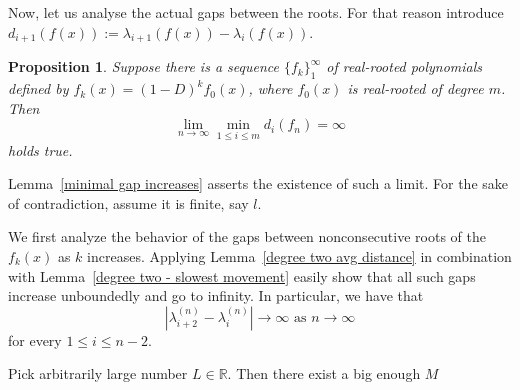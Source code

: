 \documentclass[11pt]{article}
\newtheorem{proposition}[theorem]{Proposition}
\begin{document}
Now, let us analyse the actual gaps between the roots. For that reason introduce $d_{i+1}(f(x)) := \lambda_{i+1}(f(x)) - \lambda_i(f(x))$.

\begin{proposition}
\label{miniamal gap is unbounded} 
Suppose there is a sequence $\{f_k\}_1^\infty$ of real-rooted polynomials defined by $f_k(x) = (1-D)^k f_0(x)$, where $f_0(x)$ is real-rooted of degree $m$. Then
\[\lim_{n\to\infty} \min_{1\leq i \leq m} d_i (f_n) = \infty\]
holds true.
\end{proposition}
\proof Lemma~\ref{minimal gap increases} asserts the existence of such a limit. For the sake of contradiction, assume it is finite, say $l$. 

We first analyze the behavior of the gaps between nonconsecutive roots of the $f_k(x)$ as $k$ increases. Applying Lemma~\ref{degree two avg distance} in combination with Lemma~\ref{degree two - slowest movement} easily show that all such gaps increase unboundedly and go to infinity. In particular, we have that
\[|\lambda^{(n)}_{i+2} - \lambda^{(n)}_i|\to \infty\text{~as~$n\to\infty$}\]
for every $1\leq i \leq n-2$. 

Pick arbitrarily large number $L\in\mathbb{R}$. Then there exist a big enough $M$  
\end{document}
